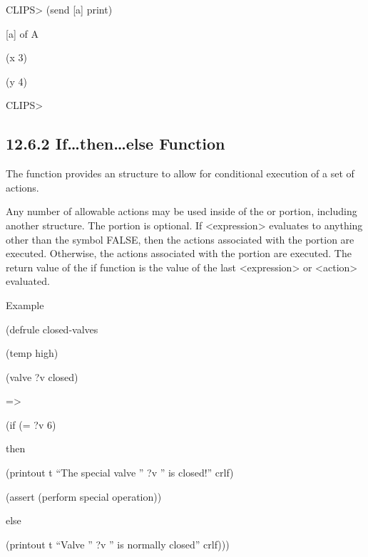 \documentclass[letterpaper,10pt,english]{sphinxmanual}
\begin{document}
CLIPS\textgreater{} (send {[}a{]} print)

{[}a{]} of A

(x 3)

(y 4)

CLIPS\textgreater{}


\subsection{12.6.2 If…then…else Function}
\label{\detokenize{actions:if-then-else-function}}
The  function provides an  structure to allow
for conditional execution of a set of actions.


\begin{sphinxVerbatim}[commandchars=\\\{\}]
  
 
 \PYGZbs{}
 \PYG{p}{[}
 \PYG{p}{]}
\end{sphinxVerbatim}

Any number of allowable actions may be used inside of the  or
 portion, including another  structure. The
 portion is optional. If \textless{}expression\textgreater{} evaluates to anything
other than the symbol FALSE, then the actions associated with the
 portion are executed. Otherwise, the actions associated with
the  portion are executed. The return value of the if function
is the value of the last \textless{}expression\textgreater{} or \textless{}action\textgreater{} evaluated.

Example

\begin{DUlineblock}{0em}
\item[] (defrule closed-valves
\item[] (temp high)
\item[] (valve ?v closed)
\item[] =\textgreater{}
\item[] (if (= ?v 6)
\item[] then
\item[] (printout t “The special valve ” ?v ” is closed!” crlf)
\item[] (assert (perform special operation))
\item[] else
\item[] (printout t “Valve ” ?v ” is normally closed” crlf)))
\end{DUlineblock}
\end{document}
